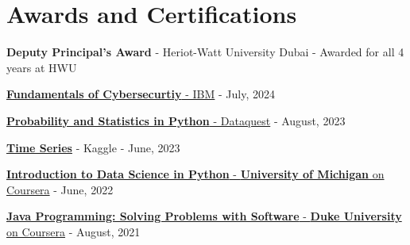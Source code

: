 \documentclass[a4paper,30pt]{article}
\begin{document}
\section{Awards and Certifications}
\begin{description}[font=$\bullet$]
	\item {\textbf{Deputy Principal's Award} - Heriot-Watt University Dubai - Awarded for all 4 years at HWU}
	\vspace{-5pt}
    \item {\href{https://www.credly.com/badges/bd342619-ff37-4475-8683-8cb135ad48df/public_url}{\textbf{Fundamentals of Cybersecurtiy} - IBM} - July, 2024}
	\vspace{-5pt}
	\item {\href{https://app.dataquest.io/view_cert/EBM2BTTAJNWMT1B7E556}{\textbf{Probability and Statistics in Python} - Dataquest} - August, 2023}
	\vspace{-5pt}
	\item {\href{https://www.kaggle.com/learn/certification/ahmeds2004/time-series}{\textbf{Time Series}} - Kaggle - June, 2023}
	\vspace{-5pt}
	\item {\href{https://www.coursera.org/account/accomplishments/certificate/QW344CUL7H7M}{\textbf{Introduction to Data Science in Python} - \textbf{University of Michigan} on Coursera} - June, 2022}
	\vspace{-5pt}
    \item {\href{https://www.coursera.org/account/accomplishments/certificate/K4TSJRXTE5XR}{\textbf{Java Programming: Solving Problems with Software} - \textbf{Duke University} on Coursera} - August, 2021}
\end{description}
\vspace{-5pt}
\end{document}
